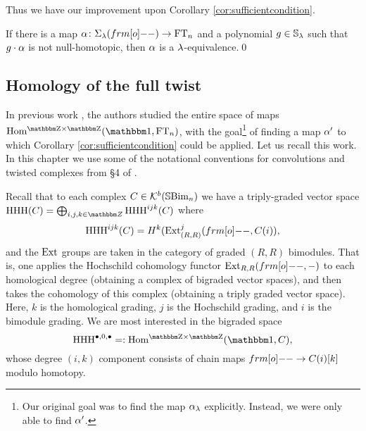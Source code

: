 
Thus we have our improvement upon Corollary \ref{cor:sufficientcondition}.

\begin{cor} \label{cor:sufficientcondition2} If there is a map $\a \co \shift{\l}{\one}\to \FT_n$ and a polynomial $g \in {\mathbb{S}}_\lambda$ such that $g \cdot \alpha$ is not null-homotopic, then $\alpha$
is a $\lambda$-equivalence.\qed \end{cor}

\subsection{Homology of the full twist}
\label{subsec:FTHHH}

In previous work \cite{ElHog16a}, the authors studied the entire space of maps $\Homgg(\one,\FT_n)$, with the goal\footnote{Our original goal was to find the map $\alpha_\lambda$ explicitly.
Instead, we were only able to find $\alpha'$.} of finding a map $\alpha'$ to which Corollary \ref{cor:sufficientcondition} could be applied. Let us recall this work. In this chapter we use some of the notational conventions for convolutions and twisted complexes from \S 4 of \cite{ElHog17a}.

Recall that to each complex $C\in {\mathcal{K}}^b({\mathbb{S}}{\rm Bim }_n)$ we have a triply-graded vector space $\HHH(C)=\bigoplus_{i,j,k\in \Z}\HHH^{ijk}(C)$ where
\[
\HHH^{ijk}(C)=H^k(\Ext_{(R,R)}^j(\one,C(i)),
\]
and the $\operatorname{Ext}$ groups are taken in the category of graded $(R,R)$ bimodules. That is, one applies the Hochschild cohomology functor $\Ext_{R,R}(\one,-)$ to each homological degree (obtaining a complex of bigraded vector spaces), and then takes the cohomology of this complex (obtaining a triply graded vector space). Here, $k$ is the homological grading, $j$ is the Hochschild grading, and $i$ is the bimodule grading. We are most interested in the bigraded space
\[
\HHH^{\bullet,0,\bullet} =: \Homgg(\one,C),
\]
whose degree $(i,k)$ component consists of chain maps $\one\to C(i)[k]$ modulo homotopy.

